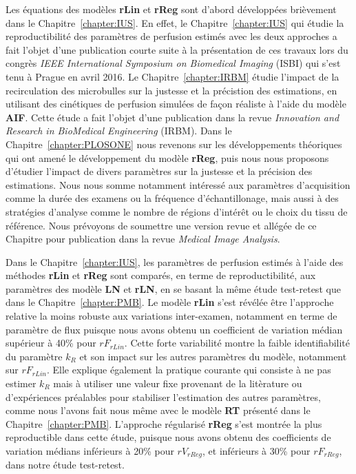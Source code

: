 \begin{otherlanguage}{francais}
Les \'equations des mod\`eles \textbf{rLin} et \textbf{rReg} sont d'abord d\'evelopp\'ees bri\`evement dans le Chapitre~\ref{chapter:IUS}.
En effet, le Chapitre~\ref{chapter:IUS} qui \'etudie la reproductibilit\'e des param\`etres de perfusion estim\'es avec les deux approches a fait l'objet d'une publication courte suite \`a la pr\'esentation de ces travaux lors du congr\`es {\em IEEE International Symposium on Biomedical Imaging} (ISBI) qui s'est tenu \`a Prague en avril 2016.
Le Chapitre~\ref{chapter:IRBM} \'etudie l'impact de la recirculation des microbulles sur la justesse et la pr\'ecistion des estimations, en utilisant des cin\'etiques de perfusion simul\'ees de fa\c{c}on r\'ealiste  \`a l'aide du mod\`ele \textbf{AIF}.
Cette \'etude a fait l'objet d'une publication dans la revue {\em Innovation and Research in BioMedical Engineering} (IRBM).
Dans le Chapitre~\ref{chapter:PLOSONE} nous revenons sur les d\'eveloppements th\'eoriques qui ont amen\'e le d\'eveloppement du mod\`ele \textbf{rReg}, puis nous nous proposons d'\'etudier l'impact de divers param\`etres sur la justesse et la pr\'ecision des estimations.
Nous nous somme notamment int\'eress\'e aux param\`etres d'acquisition comme la dur\'ee des examens ou la fr\'equence d'\'echantillonage, mais aussi \`a des strat\'egies d'analyse comme le nombre de r\'egions d'int\'er\^et ou le choix du tissu de r\'ef\'erence.
Nous pr\'evoyons de soumettre une version revue et all\'eg\'ee de ce Chapitre pour publication dans la revue {\em Medical Image Analysis}.

Dans le Chapitre~\ref{chapter:IUS}, les param\`etres de perfusion estim\'es \`a l'aide des m\'ethodes \textbf{rLin} et \textbf{rReg} sont compar\'es, en terme de reproductibilit\'e, aux param\`etres des mod\`ele \textbf{LN} et \textbf{rLN}, en se basant la m\^eme \'etude test-retest que dans le Chapitre~\ref{chapter:PMB}.
Le mod\`ele \textbf{rLin} s'est r\'ev\'el\'ee \^etre l'approche relative la moins robuste aux variations inter-examen, notamment en terme de param\`etre de flux puisque nous avons obtenu un coefficient de variation m\'edian sup\'erieur \`a 40\% pour $rF_{rLin}$.
Cette forte variabilit\'e montre la faible identifiabilit\'e du param\`etre $k_R$ et son impact sur les autres param\`etres du mod\`ele, notamment sur $rF_{rLin}$.
Elle explique \'egalement la pratique courante qui consiste \`a ne pas estimer $k_R$ mais \`a utiliser une valeur fixe provenant de la lit\`erature ou d'exp\'eriences pr\'ealables pour stabiliser l'estimation des autres param\`etres, comme nous l'avons fait nous m\^eme avec le mod\`ele \textbf{RT} pr\'esent\'e dans le Chapitre~\ref{chapter:PMB}.
L'approche r\'egularis\'e \textbf{rReg} s'est montr\'ee la plus reproductible dans cette \'etude, puisque nous avons obtenu des coefficients de variation m\'edians inf\'erieurs \`a 20\% pour $rV_{rReg}$, et inf\'erieurs \`a 30\% pour $rF_{rReg}$, dans notre \'etude test-retest.


\end{otherlanguage}

